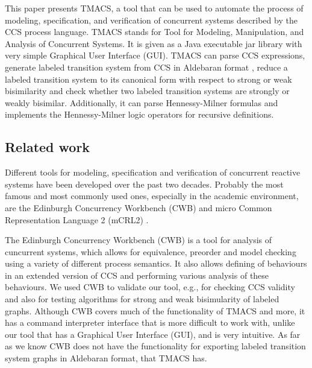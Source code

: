 This paper presents TMACS, a tool that can be used to automate the process of modeling, specification, and verification of concurrent systems described by the CCS process language. TMACS stands for Tool for Modeling, Manipulation, and Analysis of Concurrent Systems. It is given as a Java executable jar library \cite{Jar} with very simple Graphical User Interface (GUI). TMACS can parse CCS expressions, generate labeled transition system from CCS in Aldebaran format \cite{Aldebaran}, reduce a labeled transition system to its canonical form with respect to strong or weak bisimilarity and check whether two labeled transition systems are strongly or weakly bisimilar. Additionally, it can parse Hennessy-Milner formulas and implements the Hennessy-Milner logic operators for recursive definitions.

\subsection{Related work} 

Different tools for modeling, specification and verification of concurrent reactive systems have been developed over the past two decades. Probably the most famous and most commonly used ones, especially in the academic environment, are the Edinburgh Concurrency Workbench (CWB) \cite{CWB} and micro Common Representation Language 2 (mCRL2) \cite{mCRL2}\cite{ProcessAlgebraParallel}. 

The Edinburgh Concurrency Workbench (CWB) is a tool for analysis of cuncurrent systems, which allows for equivalence, preorder and model checking using a variety of different process semantics. It also allows defining of behaviours in an extended version of CCS and performing various analysis of these behaviours. We used CWB to validate our tool, e.g., for checking CCS validity and also for testing algorithms for strong and weak bisimularity of labeled graphs. Although CWB covers much of the functionality of TMACS and more, it has a command interpreter interface that is more difficult to work with, unlike our tool that has a Graphical User Interface (GUI), and is very intuitive. As far as we know CWB does not have the functionality for exporting labeled transition system graphs in Aldebaran format, that TMACS has. 


